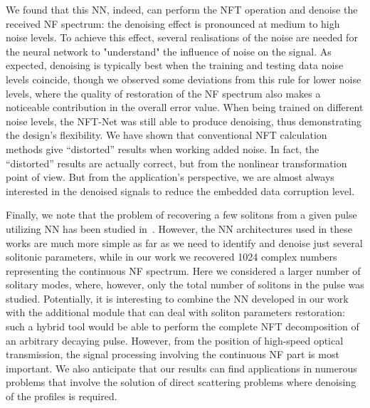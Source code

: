 We found that this NN, indeed, can perform the NFT operation and denoise the received NF spectrum: the denoising effect is pronounced at medium to high noise levels. 
To achieve this effect, several realisations of the noise are needed for the neural network to "understand" the influence of noise on the signal. 
As expected, denoising is typically best when the training and testing data noise levels coincide, though we observed some deviations from this rule for lower noise levels, where the quality of restoration of the NF spectrum also makes a noticeable contribution in the overall error value. When being trained on different noise levels, the NFT-Net was still able to produce denoising, thus demonstrating the design's flexibility. We have shown that conventional NFT calculation methods give ``distorted'' results when working added noise. In fact, the ``distorted'' results are actually correct, but from the nonlinear transformation point of view. But from the application's perspective, we are almost always interested in the denoised signals to reduce the embedded data corruption level.

Finally, we note that the problem of recovering a few solitons from a given pulse utilizing NN has been studied in~\cite{jgy18,ymm19,wxz20,mishina2021eigenvalue}. However, the NN architectures used in these works are much more simple as far as we need to identify and denoise just several solitonic parameters, while in our work we recovered 1024 complex numbers representing the continuous NF spectrum. Here we considered a larger number of solitary modes, where, however, only the total number of solitons in the pulse was studied. 
Potentially, it is interesting to combine the NN developed in our work with the additional module that can deal with soliton parameters restoration: such a hybrid tool would be able to perform the complete NFT decomposition of an arbitrary decaying pulse. However, from the position of high-speed optical transmission, the signal processing involving the continuous NF part is most important. We also anticipate that our results can find applications in numerous problems that involve the solution of direct scattering problems where denoising of the profiles is required.

